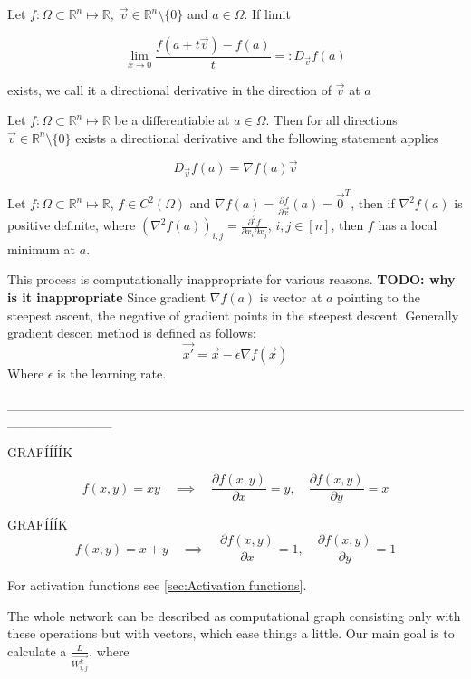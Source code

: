 \begin{definition} 
    Let $f: \Omega \subset \mathbb{R}^n \mapsto \mathbb{R}, \; \Vec{v} \in \mathbb{R}^n \setminus \{0\}$ and $a \in \Omega$. If limit
    
    $$
     \lim_{x\to 0} \frac{f(a+t\Vec{v})-f(a)}{t} =: D_{\Vec{v}} f(a)
    $$
    
    exists, we call it a directional derivative in the direction of $\Vec{v}$ at $a$
\end{definition}


\begin{theorem}
    Let $f: \Omega \subset \mathbb{R}^n \mapsto \mathbb{R}$ be a differentiable at $a \in \Omega$. Then for all directions $\Vec{v} \in \mathbb{R}^n \setminus \{0\}$ exists a directional derivative and the following statement applies

    $$
    D_{\Vec{v}} f(a) = \nabla f(a)\Vec{v}
    $$
\end{theorem}

\begin{theorem}
    Let $f: \Omega \subset \mathbb{R}^n \mapsto \mathbb{R}$, $ f \in C^2(\Omega)$ and $\nabla f(a) = \frac{\partial f}{\partial \Vec{x}}(a) = \Vec{0}^T$, then if $\nabla^2 f(a)$ is positive definite, where $(\nabla^2 f(a))_{i,j} = \frac{\partial^2 f}{\partial x_i \partial x_j}$, $i, j \in [n]$, then $f$ has a local minimum at $a$.
\end{theorem}

\par This process is computationally inappropriate for various reasons. 
\textbf{TODO: why is it inappropriate}
Since gradient $\nabla f(a)$ is vector at $a$ pointing to the steepest ascent, the negative of gradient points in the steepest descent. Generally gradient descen method is defined as follows:
\begin{equation}
    \label{gradient descent}
    \Vec{x'} = \Vec{x} - \epsilon \nabla f(\Vec{x})
\end{equation}
Where $\epsilon$ is the learning rate.

___________________________________________________________


GRAFÍÍÍÍK

\begin{equation}
    f(x,y) = xy \quad \implies \quad \frac{\partial f(x,y)}{\partial x} = y, \quad \frac{\partial f(x,y)}{\partial y} = x
\end{equation}

GRAFÍÍÍK
\begin{equation}
    f(x,y) = x+y \quad \implies \quad \frac{\partial f(x,y)}{\partial x} = 1, \quad \frac{\partial f(x,y)}{\partial y} = 1
\end{equation}

For activation functions see \ref{sec:Activation functions}. 
\par The whole network can be described as computational graph consisting only with these operations but with vectors, which ease things a little. Our main goal is to calculate a $\frac{L}{\Vec{W_{i,j}^{k}}}$, where 
